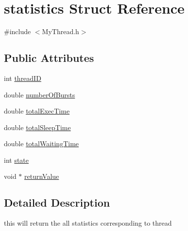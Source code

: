 \hypertarget{structstatistics}{\section{statistics Struct Reference}
\label{structstatistics}
}


{\ttfamily \#include $<$My\+Thread.\+h$>$}

\subsection*{Public Attributes}
\begin{DoxyCompactItemize}
\item 
int \hyperlink{structstatistics_a5c48986d000837a81f031d7e5bf67493}{thread\+I\+D}
\item 
double \hyperlink{structstatistics_a8e8a0ef64766f7b89b16d6670b3e2c13}{number\+Of\+Bursts}
\item 
double \hyperlink{structstatistics_a8874aa4d398b5f67d6c829100b9bf97a}{total\+Exec\+Time}
\item 
double \hyperlink{structstatistics_a1f0439010d53389154db4aeec91e23f2}{total\+Sleep\+Time}
\item 
double \hyperlink{structstatistics_ac1ba48e4a7f9f36f32da719f1beb6c44}{total\+Waiting\+Time}
\item 
int \hyperlink{structstatistics_a9d202292a83d65bf5f21c3f39ceb79a0}{state}
\item 
void $\ast$ \hyperlink{structstatistics_a26498872dfc8b8f14c9979b6a120d143}{return\+Value}
\end{DoxyCompactItemize}


\subsection{Detailed Description}
this will return the all statistics corresponding to thread 

